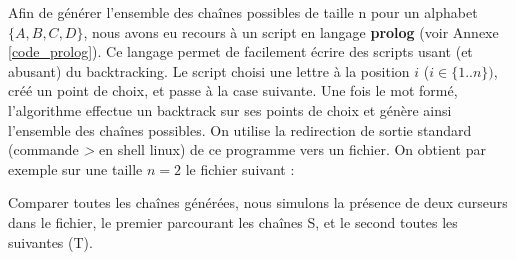 Afin de générer l'ensemble des chaînes possibles de taille n pour un alphabet $\{A,B,C,D\}$, nous avons eu recours à un script en langage \textbf{prolog} (voir Annexe \ref{code_prolog}).
Ce langage permet de facilement écrire des scripts usant (et abusant) du backtracking. Le script choisi une lettre à la position $i$ ($i\in \{1..n\})$, créé un point de choix, et passe à la case suivante.
Une fois le mot formé, l'algorithme effectue un backtrack sur ses points de choix et génère ainsi l'ensemble des chaînes possibles. On utilise la redirection de sortie standard (commande \textit{>} en shell linux) de ce programme vers un fichier.
On obtient par exemple sur une taille $n=2$ le fichier suivant :\\
\begin{center}
\end{center}

Comparer toutes les chaînes générées, nous simulons la présence de deux curseurs dans le fichier, le premier parcourant les chaînes S, et le second toutes les suivantes (T).